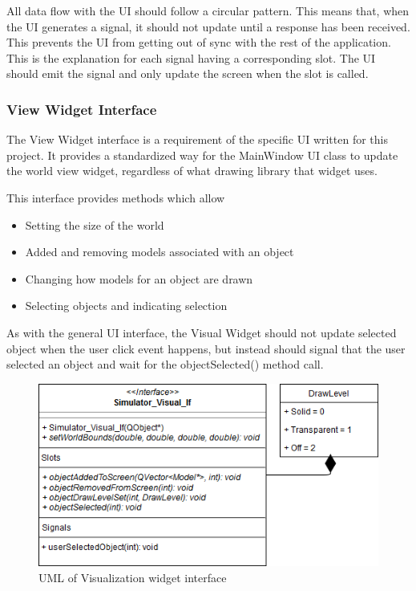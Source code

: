  All data flow with the UI should follow a circular pattern. This means that, when the UI generates a signal, it should not update until a response has been received. This prevents the UI from getting out of sync with the rest of the application. This is the explanation for each signal having a corresponding slot. The UI should emit the signal and only update the screen when the slot is called.
 	
  \subsubsection*{View Widget Interface}
  The View Widget interface is a requirement of the specific UI written for this project. It provides a standardized way for the MainWindow UI class to update the world view widget, regardless of what drawing library that widget uses.
  
  This interface provides methods which allow
  \begin{itemize}
  	\item Setting the size of the world
  	\item Added and removing models associated with an object
  	\item Changing how models for an object are drawn
  	\item Selecting objects and indicating selection
  \end{itemize}
  
  As with the general UI interface, the Visual Widget should not update selected object when the user click event happens, but instead should signal that the user selected an object and wait for the objectSelected() method call.
 \begin{figure}[h]
 	\begin{center}
 	\includegraphics[scale=0.5]{./images_design/uml/Visual_If}
 	\caption{UML of Visualization widget interface\label{uml:visual_if}}
 	\end{center}
 \end{figure}
